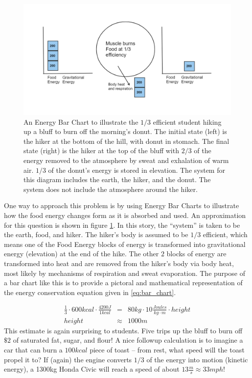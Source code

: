 \documentclass[12pt]{iopart}
\newcommand{\bea}{\begin{eqnarray}}
\newcommand{\eea}{\end{eqnarray}}
\begin{document}
\begin{figure}[h]
\centering
\includegraphics[width=\columnwidth]{bar_chart.png}
\caption{An Energy Bar Chart to illustrate the $1/3$ efficient student hiking up a bluff to burn off the morning's donut.  The initial state (left) is the hiker at the bottom of the hill, with donut in stomach.  The final state (right) is the hiker at the top of the bluff with $2/3$ of the energy removed to the atmosphere by sweat and exhalation of warm air. $1/3$ of the donut's energy is stored in elevation.  The system for this diagram includes the earth, the hiker, and the donut.  The system does not include the atmosphere around the hiker.  
}
\label{bar_chart}
\end{figure}

One way to approach this problem is by using Energy Bar Charts \cite{energy_bar_charts} to illustrate how the food energy  changes form as it is absorbed and used.  An approximation for this question is shown in figure \ref{bar_chart}.  In this story, the ``system'' is taken to be the earth, food, and hiker.  The hiker's body is assumed to be $1/3$ efficient, which means one of the Food Energy blocks of energy is transformed into gravitational energy (elevation) at the end of the hike.  The other $2$ blocks of energy are transformed into heat and are removed from the hiker's body via body heat, most likely by mechanisms of respiration and sweat evaporation. The purpose of a bar chart like this is to provide a pictoral and mathematical representation of the energy conservation equation given in \ref{eq:bar_chart}.         

\bea
\frac{1}{3}\cdot600kcal\cdot\frac{4200J}{1kcal} 
	&=& 80kg\cdot10\frac{Joules}{kg\cdot m}\cdot height \label{eq:bar_chart}\\
height &\approx&  1000 m
\eea
This estimate is again surprising to students.  Five trips up the bluff to burn off $\$2$ of saturated fat, sugar, and flour!  A nice followup calculation is to imagine a car that can burn a $100kcal$ piece of toast -- from rest, what speed will the toast propel it to? If (again) the engine converts $1/3$ of the energy into motion (kinetic energy), a 1300kg Honda Civic will reach a speed of about $13\frac{m}{s}\approx33mph$!  
\end{document}
